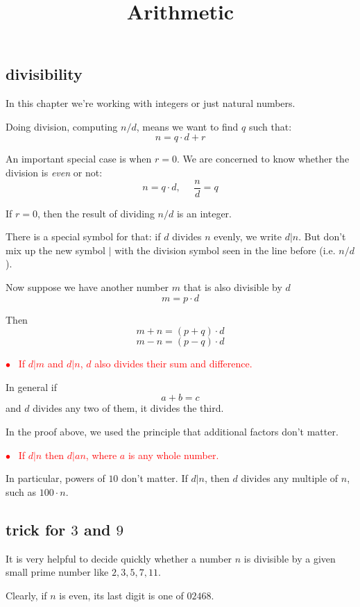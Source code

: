 \documentclass[11pt, oneside]{article}
\title{Arithmetic}
\date{}
\begin{document}
\maketitle
\Large

\subsection*{divisibility}

In this chapter we're working with integers or just natural numbers.

Doing division, computing $n/d$, means we want to find $q$ such that:
\[ n = q \cdot d + r \]

An important special case is when $r = 0$.  We are concerned to know whether the division is \emph{even} or not:
\[ n = q \cdot d, \ \ \ \ \ \ \frac{n}{d} = q \]

If $r = 0$, then the result of dividing $n/d$ is an integer.

There is a special symbol for that:  if $d$ divides $n$ evenly, we write $d|n$.  But don't mix up the new symbol $|$ with the division symbol seen in the line before (i.e. $n/d$).

Now suppose we have another number $m$ that is also divisible by $d$
\[ m = p \cdot d \]

Then 
\[ m + n = (p + q) \cdot d \]
\[ m - n = (p - q) \cdot d \]

\textcolor{red}{$\bullet$ \ If $d|m$ and $d|n$, $d$ also divides their sum and difference.} 

In general if
\[ a + b = c \]
and $d$ divides any two of them, it divides the third.

In the proof above, we used the principle that additional factors don't matter.

\textcolor{red}{$\bullet$ \ If $d|n$ then $d|an$, where $a$ is any whole number.} 

In particular, powers of $10$ don't matter.  If $d|n$, then $d$ divides any multiple of $n$, such as $100 \cdot n$.

\subsection*{trick for $3$ and $9$}

It is very helpful to decide quickly whether a number $n$ is divisible by a given small prime number like $2, 3, 5, 7, 11$.

Clearly, if $n$ is even, its last digit is one of $02468$.
\end{document}
